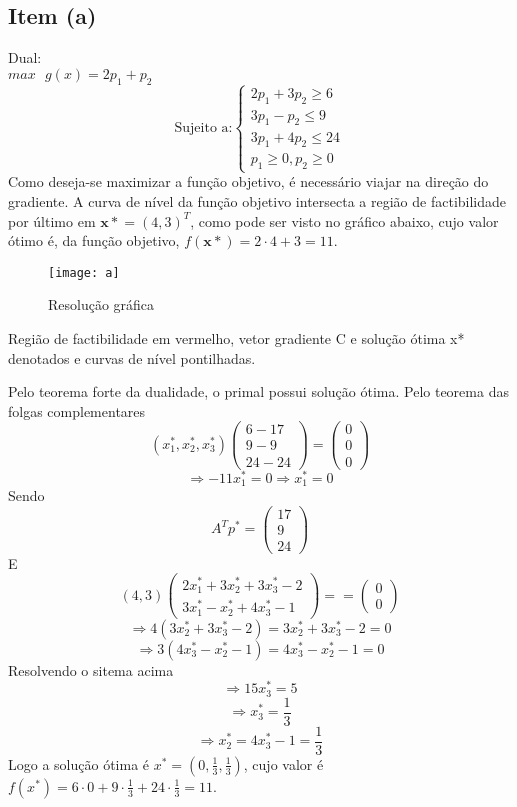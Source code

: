 \documentclass[a4paper, 12pt]{article}
\begin{document}
\subsection{Item (a)}
Dual:\\
$max\text{ }g(x)=2p_1+p_2$
\[
\text{Sujeito a:}\left\{
\begin{array}{l}
2p_1+3p_2\geq6\\
3p_1-p_2\leq9\\
3p_1+4p_2\leq24\\
p_1\geq 0, p_2\geq 0
\end{array}
\right.
\]
Como deseja-se maximizar a função objetivo, é necessário viajar na direção do gradiente. A curva de nível da função objetivo intersecta a região de factibilidade por último em $\mathbf{x*}=(4,3)^T$, como pode ser visto no gráfico abaixo, cujo valor ótimo é, da função objetivo, $f(\mathbf{x*})=2\cdot 4+3=11$.
\begin{table}[H]
\centering
\begin{figure}[H]
    \centering
    \caption{\label{fig:1} Resolução gráfica}
    \texttt{[image: a]}
\end{figure}
\small
Região de factibilidade em vermelho, vetor gradiente C e solução ótima x* denotados e curvas de nível pontilhadas.
\end{table}
Pelo teorema forte da dualidade, o primal possui solução ótima. Pelo teorema das folgas complementares
\[
(x_1^*,x_2^*,x_3^*)
\begin{pmatrix}
6-17\\
9-9\\
24-24
\end{pmatrix}
=
\begin{pmatrix}
0\\
0\\
0
\end{pmatrix}
\]
\[
\Rightarrow -11x_1^*=0\Rightarrow x_1^*=0
\]
Sendo
\[
A^Tp^*=
\begin{pmatrix}
17\\
9\\
24
\end{pmatrix}
\]
E
\[
(4,3)
\begin{pmatrix}
2x_1^*+3x_2^*+3x_3^*-2\\
3x_1^*-x_2^*+4x_3^*-1
\end{pmatrix}
=
=
\begin{pmatrix}
0\\
0
\end{pmatrix}
\]
\[
\Rightarrow 4(3x_2^*+3x_3^*-2)=3x_2^*+3x_3^*-2=0 
\]
\[
\Rightarrow 3(4x_3^*-x_2^*-1)=4x_3^*-x_2^*-1=0 
\]
Resolvendo o sitema acima
\[
\Rightarrow 15x_3^*=5
\]
\[
\Rightarrow x_3^*=\frac{1}{3}
\]
\[
\Rightarrow x_2^*=4x_3^*-1=\frac{1}{3}
\]
Logo a solução ótima é $x^*=(0,\frac{1}{3},\frac{1}{3})$, cujo valor é $f(x^*)=6\cdot 0+9\cdot \frac{1}{3}+24\cdot\frac{1}{3}=11$.
\end{document}
